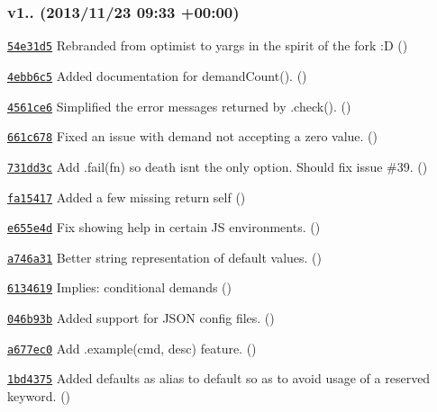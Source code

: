 \subsubsection*{v1.. (2013/11/23 09\+:33 +00\+:00)}


\begin{DoxyItemize}
\item \href{https://github.com/bcoe/yargs/commit/54e31d505f820b80af13644e460894b320bf25a3}{\tt 54e31d5} Rebranded from optimist to yargs in the spirit of the fork \+:D ()
\item \href{https://github.com/bcoe/yargs/commit/4ebb6c59f44787db7c24c5b8fe2680f01a23f498}{\tt 4ebb6c5} Added documentation for demand\+Count(). ()
\item \href{https://github.com/bcoe/yargs/commit/4561ce66dcffa95f49e8b4449b25b94cd68acb25}{\tt 4561ce6} Simplified the error messages returned by .check(). ()
\item \href{https://github.com/bcoe/yargs/commit/661c67886f479b16254a830b7e1db3be29e6b7a6}{\tt 661c678} Fixed an issue with demand not accepting a zero value. ()
\item \href{https://github.com/bcoe/yargs/commit/731dd3c37624790490bd6df4d5f1da8f4348279e}{\tt 731dd3c} Add .fail(fn) so death isn\textquotesingle{}t the only option. Should fix issue \#39. ()
\item \href{https://github.com/bcoe/yargs/commit/fa15417ff9e70dace0d726627a5818654824c1d8}{\tt fa15417} Added a few missing \textquotesingle{}return self\textquotesingle{} ()
\item \href{https://github.com/bcoe/yargs/commit/e655e4d99d1ae1d3695ef755d51c2de08d669761}{\tt e655e4d} Fix showing help in certain JS environments. ()
\item \href{https://github.com/bcoe/yargs/commit/a746a31cd47c87327028e6ea33762d6187ec5c87}{\tt a746a31} Better string representation of default values. ()
\item \href{https://github.com/bcoe/yargs/commit/6134619a7e90b911d5443230b644c5d447c1a68c}{\tt 6134619} Implies\+: conditional demands ()
\item \href{https://github.com/bcoe/yargs/commit/046b93b5d40a27367af4cb29726e4d781d934639}{\tt 046b93b} Added support for J\+S\+ON config files. ()
\item \href{https://github.com/bcoe/yargs/commit/a677ec0a0ecccd99c75e571d03323f950688da03}{\tt a677ec0} Add .example(cmd, desc) feature. ()
\item \href{https://github.com/bcoe/yargs/commit/1bd4375e11327ba1687d4bb6e5e9f3c30c1be2af}{\tt 1bd4375} Added \textquotesingle{}defaults\textquotesingle{} as alias to \textquotesingle{}default\textquotesingle{} so as to avoid usage of a reserved keyword. ()

\end{DoxyItemize}
